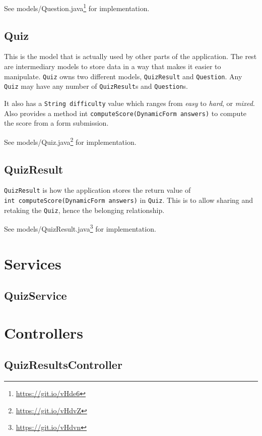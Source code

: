 \documentclass[english,a4paper,]{report}
\renewcommand{\href}[2]{#2\footnote{\url{#1}}}
\begin{document}
See \href{https://git.io/vHde6}{models/Question.java} for
implementation.

\hypertarget{quiz}{\subsection{Quiz}\label{quiz}}

This is the model that is actually used by other parts of the
application. The rest are intermediary models to store data in a way
that makes it easier to manipulate. \texttt{Quiz} owns two different
models, \texttt{QuizResult} and \texttt{Question}. Any \texttt{Quiz} may
have any number of \texttt{QuizResult}s and \texttt{Question}s.

It also has a \texttt{String\ difficulty} value which ranges from
\emph{easy} to \emph{hard}, or \emph{mixed}. Also provides a method int
\texttt{computeScore(DynamicForm\ answers)} to compute the score from a
form submission.

See \href{https://git.io/vHdvZ}{models/Quiz.java} for implementation.

\subsection{QuizResult}\label{quizresult}

\texttt{QuizResult} is how the application stores the return value of
\texttt{int\ computeScore(DynamicForm\ answers)} in \texttt{Quiz}. This
is to allow sharing and retaking the \texttt{Quiz}, hence the belonging
relationship.

See \href{https://git.io/vHdvn}{models/QuizResult.java} for
implementation.

\section{Services}\label{services}

\subsection{QuizService}\label{quizservice}

\section{Controllers}\label{controllers}

\subsection{QuizResultsController}\label{quizresultscontroller}
\end{document}
